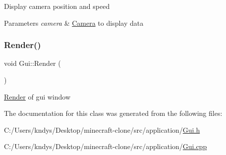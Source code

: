 Display camera position and speed 


\begin{DoxyParams}{Parameters}
{\em camera} & \mbox{\hyperlink{class_camera}{Camera}} to display data\\
\hline
\end{DoxyParams}
\mbox{\label{class_gui_ae0afe0b27557be9d9e747e7fa1b3cd86}} 
\subsubsection{\texorpdfstring{Render()}{Render()}}
{\footnotesize\ttfamily void Gui\+::\+Render (\begin{DoxyParamCaption}{ }\end{DoxyParamCaption})}



\mbox{\hyperlink{class_render}{Render}} of gui window 



The documentation for this class was generated from the following files\+:\begin{DoxyCompactItemize}
\item 
C\+:/\+Users/kndys/\+Desktop/minecraft-\/clone/src/application/\mbox{\hyperlink{_gui_8h}{Gui.\+h}}\item 
C\+:/\+Users/kndys/\+Desktop/minecraft-\/clone/src/application/\mbox{\hyperlink{_gui_8cpp}{Gui.\+cpp}}\end{DoxyCompactItemize}
